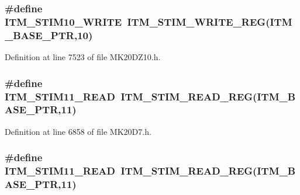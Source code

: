 \subsubsection[{\texorpdfstring{I\+T\+M\+\_\+\+S\+T\+I\+M10\+\_\+\+W\+R\+I\+TE}{ITM_STIM10_WRITE}}]{\setlength{\rightskip}{0pt plus 5cm}\#define I\+T\+M\+\_\+\+S\+T\+I\+M10\+\_\+\+W\+R\+I\+TE~{\bf I\+T\+M\+\_\+\+S\+T\+I\+M\+\_\+\+W\+R\+I\+T\+E\+\_\+\+R\+EG}({\bf I\+T\+M\+\_\+\+B\+A\+S\+E\+\_\+\+P\+TR},10)}\hypertarget{group___i_t_m___register___accessor___macros_ga777b8d32021dcda309623609448e4042}{}\label{group___i_t_m___register___accessor___macros_ga777b8d32021dcda309623609448e4042}


Definition at line 7523 of file M\+K20\+D\+Z10.\+h.

\subsubsection[{\texorpdfstring{I\+T\+M\+\_\+\+S\+T\+I\+M11\+\_\+\+R\+E\+AD}{ITM_STIM11_READ}}]{\setlength{\rightskip}{0pt plus 5cm}\#define I\+T\+M\+\_\+\+S\+T\+I\+M11\+\_\+\+R\+E\+AD~{\bf I\+T\+M\+\_\+\+S\+T\+I\+M\+\_\+\+R\+E\+A\+D\+\_\+\+R\+EG}({\bf I\+T\+M\+\_\+\+B\+A\+S\+E\+\_\+\+P\+TR},11)}\hypertarget{group___i_t_m___register___accessor___macros_ga0303347d6234c6044d64450073e3111d}{}\label{group___i_t_m___register___accessor___macros_ga0303347d6234c6044d64450073e3111d}


Definition at line 6858 of file M\+K20\+D7.\+h.

\subsubsection[{\texorpdfstring{I\+T\+M\+\_\+\+S\+T\+I\+M11\+\_\+\+R\+E\+AD}{ITM_STIM11_READ}}]{\setlength{\rightskip}{0pt plus 5cm}\#define I\+T\+M\+\_\+\+S\+T\+I\+M11\+\_\+\+R\+E\+AD~{\bf I\+T\+M\+\_\+\+S\+T\+I\+M\+\_\+\+R\+E\+A\+D\+\_\+\+R\+EG}({\bf I\+T\+M\+\_\+\+B\+A\+S\+E\+\_\+\+P\+TR},11)}\hypertarget{group___i_t_m___register___accessor___macros_ga0303347d6234c6044d64450073e3111d}{}\label{group___i_t_m___register___accessor___macros_ga0303347d6234c6044d64450073e3111d}


